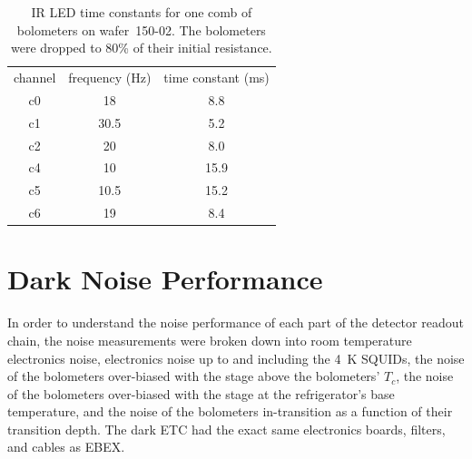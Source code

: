 \begin{table}[htp]
\begin{center}
\begin{tabular}{|c|c|c|}
channel & frequency (Hz) & time constant (ms) \\
c0 & 18 & 8.8 \\
c1 & 30.5 & 5.2 \\
c2 & 20 & 8.0 \\
c4 & 10 & 15.9 \\
c5 & 10.5 & 15.2 \\
c6 & 19 & 8.4 \\
\end{tabular}
\end{center}
\caption{IR LED time constants for one comb of bolometers on wafer~150-02. The bolometers were dropped to 80\% of their initial resistance. 
\label{tab:optical_tau} }
\end{table}









\section{Dark Noise Performance}
\label{sec:dark_noise}

In order to understand the noise performance of each part of the detector readout chain, the noise measurements were broken down into 
room temperature electronics noise, 
electronics noise up to and including the 4~K \ac{SQUID}s, 
the noise of the bolometers over-biased with the stage above the bolometers' $T_{c}$, 
the noise of the bolometers over-biased with the stage at the refrigerator's base temperature, 
and the noise of the bolometers in-transition as a function of their transition depth. 
The dark \ac{ETC} had the exact same electronics boards, filters, and cables as \ac{EBEX}. 

